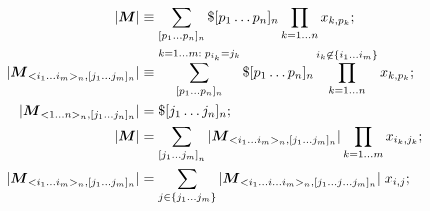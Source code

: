 \documentclass[twoside]{article}
\numberwithin{equation}{section}
\begin{document}
\begin{align*}
|\protect{\textrm{\boldmath $M$}}| &\equiv \sum_{[p_1\dots p_n]_n} \$ [p_1\dots p_n]_n \prod_{k=1 \dots n} x_{k,p_{k}}; \\
|\protect{\textrm{\boldmath $M$}}_{<i_1 \dots i_m>_n, [j_1 \dots j_m]_n}| &\equiv \sum_{[p_1 \dots p_n]_n}^{k =1 \dots m:\; p_{i_k}=j_k} \$ [p_1\dots p_n]_n 
	\prod _{k = 1 \dots n }^{i_k \not\in \{i_1 \dots i_m\}} x_{k,p_{k}}; \\
|\protect{\textrm{\boldmath $M$}}_{<1 \dots n>_n, [j_1 \dots j_n]_n}| &= \$ [j_1\dots j_n]_n; \\
|\protect{\textrm{\boldmath $M$}}| &= \sum_{{[j_1 \dots j_m]}_n} |\protect{\textrm{\boldmath $M$}} _{<i_1 \dots i_m>_n, [j_1 \dots j_m]_n}| \prod_{k=1 \dots m} x_{i_k, j_k}; \\
|\protect{\textrm{\boldmath $M$}}_{<i_1 \dots i_m>_n, [j_1 \dots j_m]_n}| &= \sum_{j \in \{j_1 \dots j_m\}} |\protect{\textrm{\boldmath $M$}}_{<i_1 \dots i \dots i_m>_n, [j_1 \dots j \dots j_m]_n}| \;x_{i, j};
\end{align*}
\end{document}

